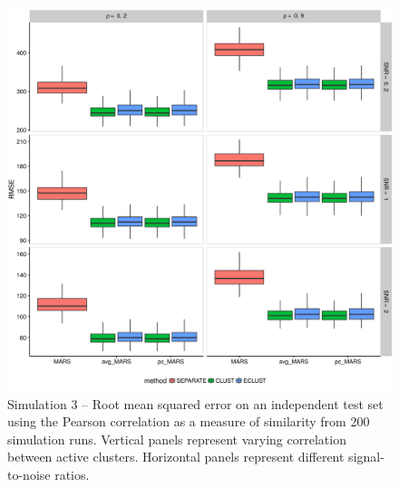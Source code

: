 \begin{appendices}
\begin{figure}[H]
	\centering
	\includegraphics[scale=0.6, keepaspectratio]{./figs/hydra/results/figures/sim3-sept27/RMSE_Correlation_sim3.png}
	\caption{Simulation 3 -- Root mean squared error on an independent test set using the Pearson correlation as a measure of similarity from 200 simulation runs. Vertical panels represent varying correlation between active clusters. Horizontal panels represent different signal-to-noise ratios.}
	\label{fig:RMSE_Correlation_sim3}
\end{figure}


\end{appendices}

